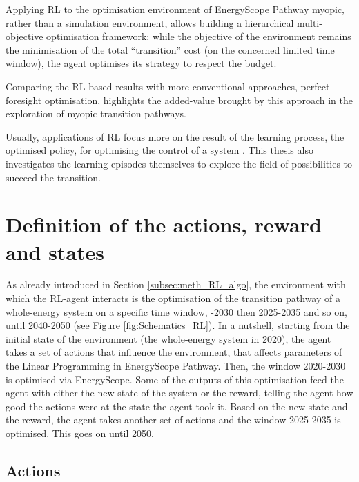 Applying \gls{RL} to the optimisation environment of EnergyScope Pathway myopic,  rather than a simulation environment, allows building a hierarchical multi-objective optimisation framework: while the objective of the environment remains the minimisation of the total ``transition'' cost (on the concerned limited time window), the agent optimises its strategy to respect the  budget. 

Comparing the \gls{RL}-based results with more conventional approaches, \ie perfect foresight optimisation, highlights the added-value brought by this approach in the exploration of myopic transition pathways.

Usually, applications of \gls{RL} focus more on the result of the learning process, the optimised policy, for optimising the control of a system \cite{perera2021applications}. This thesis also investigates the learning episodes themselves to explore the field of possibilities to succeed the transition.


\section{Definition of the actions, reward and states}
\label{sec:RL:act_states_rew}
As already introduced in Section \ref{subsec:meth_RL_algo}, the environment with which the \gls{RL}-agent interacts is the optimisation of the transition pathway of a whole-energy system on a specific time window, -2030 then 2025-2035 and so on, until 2040-2050 (see Figure \ref{fig:Schematics_RL}). In a nutshell, starting from the initial state of the environment (\ie the whole-energy system in 2020), the agent takes a set of actions that influence the environment, \ie that affects parameters of the Linear Programming in EnergyScope Pathway. Then, the window 2020-2030 is optimised via EnergyScope. Some of the outputs of this optimisation feed the agent with either the new state of the system or the reward, \ie telling the agent how good the actions were at the state the agent took it. Based on the new state and the reward, the agent takes another set of actions and the window 2025-2035 is optimised. This goes on until 2050.



\subsection{Actions}
\label{subsec:RL:act_states_rew:act}


